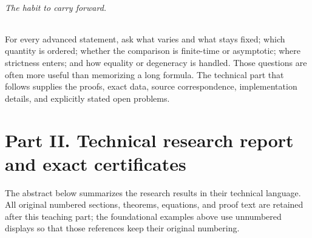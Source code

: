 \paragraph{The habit to carry forward.}
For every advanced statement, ask what varies and what stays fixed; which
quantity is ordered; whether the comparison is finite-time or asymptotic;
where strictness enters; and how equality or degeneracy is handled.
Those questions are often more useful than memorizing a long formula.
The technical part that follows supplies the proofs, exact data, source
correspondence, implementation details, and explicitly stated open problems.


\clearpage
\part*{Part II. Technical research report and exact certificates}
\noindent The abstract below summarizes the research results in their technical
language. All original numbered sections, theorems, equations, and proof text
are retained after this teaching part; the foundational examples above use
unnumbered displays so that those references keep their original numbering.
\par\bigskip
